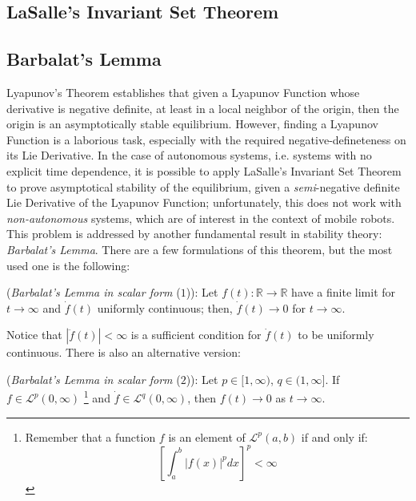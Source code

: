                     \subsection{LaSalle's Invariant Set Theorem}
                    \subsection{Barbalat's Lemma}
                        Lyapunov's Theorem establishes that given a Lyapunov Function whose derivative is negative definite, at least in a local neighbor of the origin, then the origin is an asymptotically stable equilibrium. However, finding a Lyapunov Function is a laborious task, especially with the required negative-defineteness on its Lie Derivative. In the case of autonomous systems, i.e. systems with no explicit time dependence, it is possible to apply LaSalle's Invariant Set Theorem to prove asymptotical stability of the equilibrium, given a \textit{semi}-negative definite Lie Derivative of the Lyapunov Function; unfortunately, this does not work with \textit{non-autonomous} systems, which are of interest in the context of mobile robots. \\
                        This problem is addressed by another fundamental result in stability theory: \textit{Barbalat's Lemma}. There are a few formulations of this theorem, but the most used one is the following:
                        \begin{definition}
                            (\textit{Barbalat's Lemma in scalar form} ($1$)): Let $f(t): \mathbb{R}\rightarrow\mathbb{R}$ have a finite limit for $t\rightarrow\infty$ and $\dot{f}(t)$ uniformly continuous; then, $\dot{f}(t)\rightarrow0$ for $t\rightarrow\infty$. 
                        \end{definition}
                        Notice that $|\ddot{f}(t)|<\infty$ is a sufficient condition for $\dot{f}(t)$ to be uniformly continuous. There is also an alternative version:
                        \begin{definition}
                            (\textit{Barbalat's Lemma in scalar form} ($2$)): Let $p\in[1,\infty)$, $q\in(1,\infty]$. If $f\in\mathcal{L}^{p}(0,\infty)$
                            \footnote{Remember that a function $f$ is an element of $\mathcal{L}^{p}(a,b)$ if and only if: 
                            \begin{equation*}
                                \left[\int_{a}^{b}{|f(x)|^{p}dx}\right]^{p}<\infty
                            \end{equation*}
                            } 
                            and $\dot{f}\in \mathcal{L}^{q}(0,\infty)$, then $f(t)\rightarrow0$ as $t\rightarrow\infty$.
                        \end{definition}
